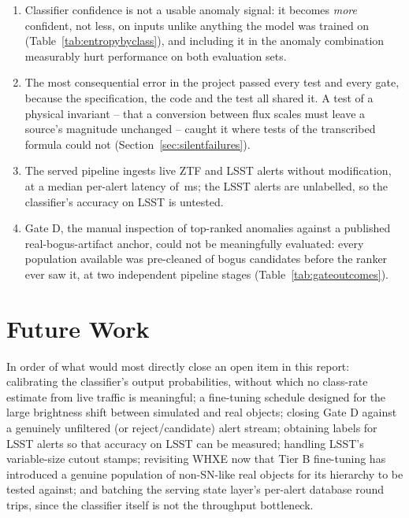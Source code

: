 \begin{enumerate}
  \item Classifier confidence is not a usable anomaly signal: it becomes
    \emph{more} confident, not less, on inputs unlike anything the model
    was trained on (Table~\ref{tab:entropybyclass}), and including it in
    the anomaly combination measurably hurt performance on both evaluation
    sets.
  \item The most consequential error in the project passed every test and
    every gate, because the specification, the code and the test all
    shared it. A test of a physical invariant -- that a conversion between
    flux scales must leave a source's magnitude unchanged -- caught it where
    tests of the transcribed formula could not
    (Section~\ref{sec:silentfailures}).
  \item The served pipeline ingests live ZTF and LSST alerts without
    modification, at a median per-alert latency of
    \ServingLatencyPFifty{}\,ms; the LSST alerts are unlabelled, so the
    classifier's accuracy on LSST is untested.
  \item Gate D, the manual inspection of top-ranked anomalies against a
    published real-bogus-artifact anchor, could not be meaningfully
    evaluated: every population available was pre-cleaned of bogus
    candidates before the ranker ever saw it, at two independent pipeline
    stages (Table~\ref{tab:gateoutcomes}).
\end{enumerate}

\section{Future Work}

In order of what would most directly close an open item in this report:
calibrating the classifier's output probabilities, without which no
class-rate estimate from live traffic is meaningful; a fine-tuning
schedule designed for the large brightness shift between simulated and
real objects; closing Gate D against a genuinely unfiltered (or
reject/candidate) alert stream; obtaining labels for LSST alerts so that
accuracy on LSST can be measured; handling LSST's variable-size cutout
stamps; revisiting WHXE now that Tier B fine-tuning has introduced a
genuine population of non-SN-like real objects for its hierarchy to be
tested against; and batching the serving state layer's per-alert database
round trips, since the classifier itself is not the throughput bottleneck.
